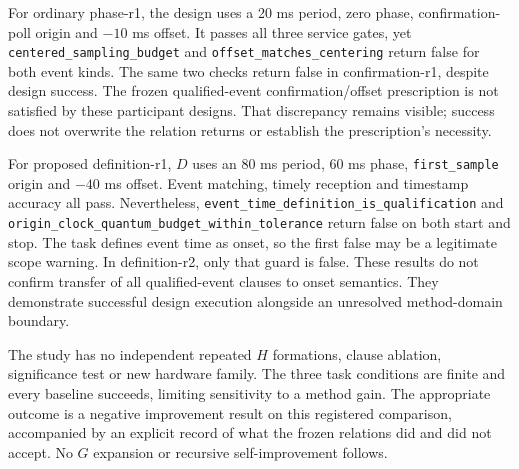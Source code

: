 For ordinary phase-r1, the design uses a 20 ms period, zero phase,
confirmation-poll origin and $-10$ ms offset. It passes all three service gates,
yet \texttt{centered\_sampling\_budget} and
\texttt{offset\_matches\_centering} return false for both event kinds. The
same two checks return false in confirmation-r1, despite design success.
The frozen qualified-event confirmation/offset prescription is not satisfied
by these participant designs. That discrepancy remains visible; success does
not overwrite the relation returns or establish the prescription's necessity.

For proposed definition-r1, $D$ uses an 80 ms period, 60 ms phase,
\texttt{first\_sample} origin and $-40$ ms offset. Event matching, timely
reception and timestamp accuracy all pass. Nevertheless,
\nolinkurl{event_time_definition_is_qualification} and
\nolinkurl{origin_clock_quantum_budget_within_tolerance} return false on
both start and stop. The task defines event time as onset, so the first false
may be a legitimate scope warning. In definition-r2, only that guard is false.
These results do not confirm transfer of all qualified-event clauses to onset
semantics. They demonstrate successful design execution alongside an unresolved
method-domain boundary.

The study has no independent repeated $H$ formations, clause ablation,
significance test or new hardware family. The three task conditions are finite
and every baseline succeeds, limiting sensitivity to a method gain. The
appropriate outcome is a negative improvement result on this registered
comparison, accompanied by an explicit record of what the frozen relations
did and did not accept. No $G$ expansion or recursive self-improvement follows.
